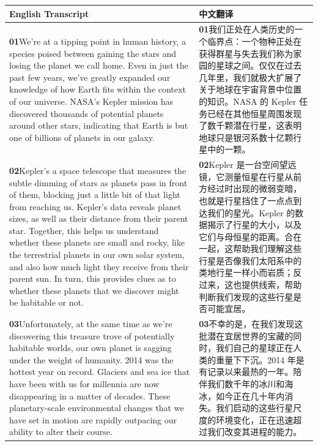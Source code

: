 \documentclass[UTF8,zihao=-4,fontset=fandol]{ctexart}
\newcommand{\TranscriptColumn}{\raggedright\arraybackslash\hyphenpenalty=10000\exhyphenpenalty=10000\sloppy}
\begin{document}
\renewcommand{\arraystretch}{1.23}
\begin{longtable}{>{\TranscriptColumn}p{} >{\TranscriptColumn}p{}}
\rowcolor{headerBg}\textbf{English Transcript} & \textbf{中文翻译} \\ \hline
\textbf{01}\quad We're at a tipping point in human history, a species poised between gaining the stars and losing the planet we call home. Even in just the past few years, we've greatly expanded our knowledge of how Earth fits within the context of our universe. NASA's Kepler mission has discovered thousands of potential planets around other stars, indicating that Earth is but one of billions of planets in our galaxy. & \textbf{01}\quad 我们正处在人类历史的一个临界点：一个物种正处在获得群星与失去我们称为家园的星球之间。仅仅在过去几年里，我们就极大扩展了关于地球在宇宙背景中位置的知识。NASA 的 Kepler 任务已经在其他恒星周围发现了数千颗潜在行星，这表明地球只是银河系数十亿颗行星中的一颗。 \\ \hline
\textbf{02}\quad Kepler's a space telescope that measures the subtle dimming of stars as planets pass in front of them, blocking just a little bit of that light from reaching us. Kepler's data reveals planet sizes, as well as their distance from their parent star. Together, this helps us understand whether these planets are small and rocky, like the terrestrial planets in our own solar system, and also how much light they receive from their parent sun. In turn, this provides clues as to whether these planets that we discover might be habitable or not. & \textbf{02}\quad Kepler 是一台空间望远镜，它测量恒星在行星从前方经过时出现的微弱变暗，也就是行星挡住了一点点到达我们的星光。Kepler 的数据揭示了行星的大小，以及它们与母恒星的距离。合在一起，这帮助我们理解这些行星是否像我们太阳系中的类地行星一样小而岩质；反过来，这也提供线索，帮助判断我们发现的这些行星是否可能宜居。 \\ \hline
\textbf{03}\quad Unfortunately, at the same time as we're discovering this treasure trove of potentially habitable worlds, our own planet is sagging under the weight of humanity. 2014 was the hottest year on record. Glaciers and sea ice that have been with us for millennia are now disappearing in a matter of decades. These planetary-scale environmental changes that we have set in motion are rapidly outpacing our ability to alter their course. & \textbf{03}\quad 不幸的是，在我们发现这批潜在宜居世界的宝藏的同时，我们自己的星球正在人类的重量下下沉。2014 年是有记录以来最热的一年。陪伴我们数千年的冰川和海冰，如今正在几十年内消失。我们启动的这些行星尺度的环境变化，正在迅速超过我们改变其进程的能力。 \\ \hline

\end{longtable}
\end{document}
